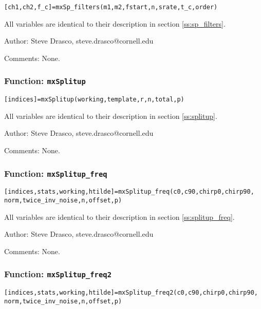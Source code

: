 \texttt{[ch1,ch2,f\_c]=mxSp\_filters(m1,m2,fstart,n,srate,t\_c,order)}

All variables are identical to their description in section \ref{ss:sp_filters}.

\begin{description}
\item{Author:} Steve Drasco, steve.drasco@cornell.edu
\item{Comments:} None.
\end{description}

\subsubsection{Function: {\tt mxSplitup}}
\label{sss:mxSplitup}

\texttt{[indices]=mxSplitup(working,template,r,n,total,p)}

All variables are identical to their description in section \ref{ss:splitup}.

\begin{description}
\item{Author:} Steve Drasco, steve.drasco@cornell.edu
\item{Comments:} None.
\end{description}

\subsubsection{Function: {\tt mxSplitup\_freq}}
\label{sss:mxSplitup_freq}

\texttt{[indices,stats,working,htilde]=mxSplitup\_freq(c0,c90,chirp0,chirp90,} \\
\texttt{norm,twice\_inv\_noise,n,offset,p)}

All variables are identical to their description in section \ref{ss:splitup_freq}.

\begin{description}
\item{Author:} Steve Drasco, steve.drasco@cornell.edu
\item{Comments:} None.
\end{description}

\subsubsection{Function: {\tt mxSplitup\_freq2}}
\label{sss:mxSplitup_freq2}

\texttt{[indices,stats,working,htilde]=mxSplitup\_freq2(c0,c90,chirp0,chirp90,} \\
\texttt{norm,twice\_inv\_noise,n,offset,p)}

